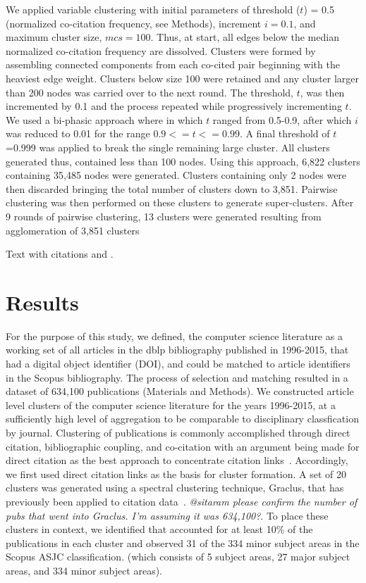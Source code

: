 We applied variable clustering with initial parameters of threshold ($t$) = 0.5 (normalized co-citation frequency, see Methods), increment $i = 0.1$, and maximum cluster size, $mcs = 100$. Thus, at start, all edges below the median normalized co-citation frequency are dissolved. Clusters were formed by assembling connected components from each co-cited pair beginning with the heaviest edge weight. Clusters below size 100 were retained and any cluster larger than 200 nodes was carried over to the next round. The threshold, $t$, was then incremented by 0.1 and the process repeated while progressively incrementing $t$.  We used a bi-phasic approach where in which $t$ ranged from 0.5-0.9, after which $i$ was reduced to 0.01 for the range $0.9<= t<= 0.99$. A final threshold of $t$=0.999 was applied to break the single remaining large cluster. All clusters generated thus, contained  less than 100 nodes.  Using this approach, 6,822 clusters containing 35,485 nodes were generated. Clusters containing only 2 nodes were then discarded bringing the total number of clusters down to 3,851. Pairwise clustering was then performed on these clusters to generate super-clusters. After 9 rounds of pairwise clustering, 13 clusters were generated resulting from agglomeration of 3,851 clusters 

\label{sec:1}
Text with citations \cite{RefB} and \cite{RefJ}.

\section{Results}
\label{sec:2}

For the purpose of this study, we defined, the computer science literature as a working set of all articles in the dblp bibliography published in 1996-2015, that had a digital object identifier (DOI), and could be matched to article identifiers in the Scopus bibliography. The process of selection and matching resulted in a dataset of 634,100 publications (Materials and Methods). We constructed article level clusters of the computer science literature for the years 1996-2015, at a sufficiently high level of aggregation to be comparable to disciplinary classfication by journal. Clustering of publications is commonly accomplished through direct citation, bibliographic coupling, and co-citation with an argument being made for direct citation as the best approach to concentrate citation links~\cite{klavans_which_2017}. Accordingly, we first used direct citation links as the basis for cluster formation. A set of 20 clusters was generated using a spectral clustering technique, Graclus, that has previously been applied to citation data~\cite{graclus_2007, subelj_clustering_2016}.  \emph{@sitaram please confirm the number of pubs that went into Graclus. I'm assuming it was 634,100?}. To place these clusters in context, we identified that accounted for at least 10\% of the publications in each cluster and observed 31 of the 334 minor subject areas in the Scopus ASJC classification. (which consists of 5 subject areas, 27 major subject areas, and 334 minor subject areas). 

